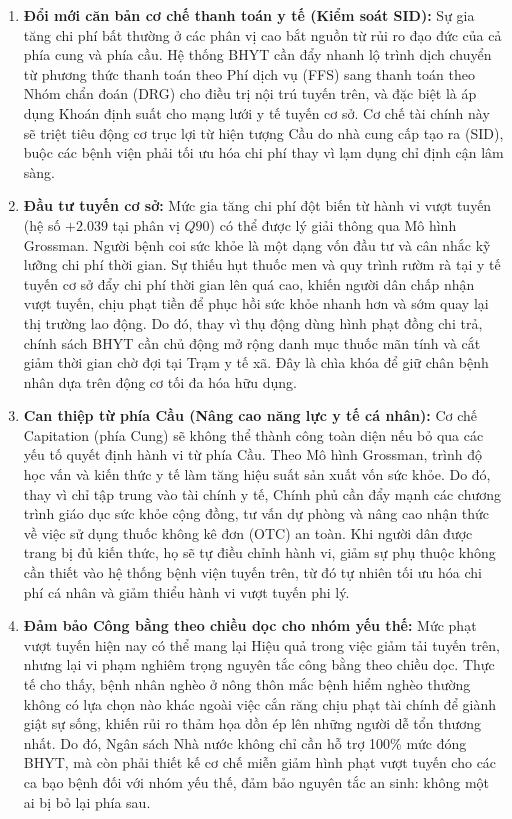 \documentclass[12pt,a4paper]{article}
\begin{document}
\begin{enumerate}
	\item \textbf{Đổi mới căn bản cơ chế thanh toán y tế (Kiểm soát SID):} Sự gia tăng chi phí bất thường ở các phân vị cao bắt nguồn từ rủi ro đạo đức của cả phía cung và phía cầu. Hệ thống BHYT cần đẩy nhanh lộ trình dịch chuyển từ phương thức thanh toán theo Phí dịch vụ (FFS) sang thanh toán theo Nhóm chẩn đoán (DRG) cho điều trị nội trú tuyến trên, và đặc biệt là áp dụng Khoán định suất cho mạng lưới y tế tuyến cơ sở. Cơ chế tài chính này sẽ triệt tiêu động cơ trục lợi từ hiện tượng Cầu do nhà cung cấp tạo ra (SID), buộc các bệnh viện phải tối ưu hóa chi phí thay vì lạm dụng chỉ định cận lâm sàng.
	
	\item \textbf{Đầu tư tuyến cơ sở:} Mức gia tăng chi phí đột biến từ hành vi vượt tuyến (hệ số $+2.039$ tại phân vị $Q90$) có thể được lý giải thông qua Mô hình Grossman. Người bệnh coi sức khỏe là một dạng vốn đầu tư và cân nhắc kỹ lưỡng chi phí thời gian. Sự thiếu hụt thuốc men và quy trình rườm rà tại y tế tuyến cơ sở đẩy chi phí thời gian lên quá cao, khiến người dân chấp nhận vượt tuyến, chịu phạt tiền để phục hồi sức khỏe nhanh hơn và sớm quay lại thị trường lao động. Do đó, thay vì thụ động dùng hình phạt đồng chi trả, chính sách BHYT cần chủ động mở rộng danh mục thuốc mãn tính và cắt giảm thời gian chờ đợi tại Trạm y tế xã. Đây là chìa khóa để giữ chân bệnh nhân dựa trên động cơ tối đa hóa hữu dụng.
	
	\item \textbf{Can thiệp từ phía Cầu (Nâng cao năng lực y tế cá nhân):} Cơ chế Capitation (phía Cung) sẽ không thể thành công toàn diện nếu bỏ qua các yếu tố quyết định hành vi từ phía Cầu. Theo Mô hình Grossman, trình độ học vấn và kiến thức y tế làm tăng hiệu suất sản xuất vốn sức khỏe. Do đó, thay vì chỉ tập trung vào tài chính y tế, Chính phủ cần đẩy mạnh các chương trình giáo dục sức khỏe cộng đồng, tư vấn dự phòng và nâng cao nhận thức về việc sử dụng thuốc không kê đơn (OTC) an toàn. Khi người dân được trang bị đủ kiến thức, họ sẽ tự điều chỉnh hành vi, giảm sự phụ thuộc không cần thiết vào hệ thống bệnh viện tuyến trên, từ đó tự nhiên tối ưu hóa chi phí cá nhân và giảm thiểu hành vi vượt tuyến phi lý.
	
	\item \textbf{Đảm bảo Công bằng theo chiều dọc cho nhóm yếu thế:} Mức phạt vượt tuyến hiện nay có thể mang lại Hiệu quả trong việc giảm tải tuyến trên, nhưng lại vi phạm nghiêm trọng nguyên tắc công bằng theo chiều dọc. Thực tế cho thấy, bệnh nhân nghèo ở nông thôn mắc bệnh hiểm nghèo thường không có lựa chọn nào khác ngoài việc cắn răng chịu phạt tài chính để giành giật sự sống, khiến rủi ro thảm họa dồn ép lên những người dễ tổn thương nhất. Do đó, Ngân sách Nhà nước không chỉ cần hỗ trợ 100\% mức đóng BHYT, mà còn phải thiết kế cơ chế miễn giảm hình phạt vượt tuyến cho các ca bạo bệnh đối với nhóm yếu thế, đảm bảo nguyên tắc an sinh: không một ai bị bỏ lại phía sau.
	

\end{enumerate}
\end{document}
